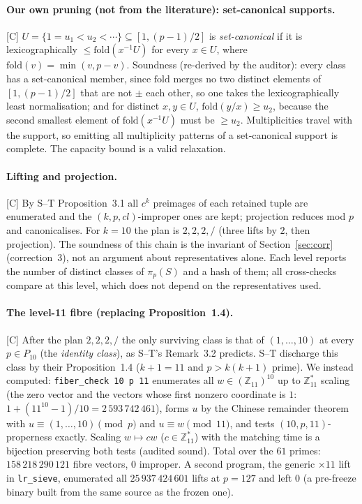 \documentclass[10pt]{article}
\newcommand{\tier}[1]{\textsf{[#1]}}
\newcommand{\tC}{\tier{C}}
\newcommand{\Z}{\mathbb{Z}}
\begin{document}
\paragraph{Our own pruning (not from the literature): set-canonical supports.}\tC{} $U=\{1=u_1<u_2<\cdots\}\subseteq[1,(p-1)/2]$ is \emph{set-canonical} if it is lexicographically $\le\mathrm{fold}(x^{-1}U)$ for every $x\in U$, where $\mathrm{fold}(v)=\min(v,p-v)$. Soundness (re-derived by the auditor): every class has a set-canonical member, since $\mathrm{fold}$ merges no two distinct elements of $[1,(p-1)/2]$ that are not $\pm$ each other, so one takes the lexicographically least normalisation; and for distinct $x,y\in U$, $\mathrm{fold}(y/x)\ge u_2$, because the second smallest element of $\mathrm{fold}(x^{-1}U)$ must be $\ge u_2$. Multiplicities travel with the support, so emitting all multiplicity patterns of a set-canonical support is complete. The capacity bound is a valid relaxation.

\paragraph{Lifting and projection.}\tC{} By S--T Proposition~3.1 all $c^k$ preimages of each retained tuple are enumerated and the $(k,p,cl)$-improper ones are kept; projection reduces mod $p$ and canonicalises. For $k=10$ the plan is $2,2,2,/$ (three lifts by $2$, then projection). The soundness of this chain is the invariant of Section~\ref{sec:corr} (correction~3), not an argument about representatives alone. Each level reports the number of distinct classes of $\pi_p(S)$ and a hash of them; all cross-checks compare at this level, which does not depend on the representatives used.

\paragraph{The level-11 fibre (replacing Proposition~1.4).}\tC{} After the plan $2,2,2,/$ the only surviving class is that of $(1,\dots,10)$ at every $p\in P_{10}$ (the \emph{identity class}), as S--T's Remark~3.2 predicts. S--T discharge this class by their Proposition~1.4 ($k+1=11$ and $p>k(k+1)$ prime). We instead computed: \texttt{fiber\_check 10 p 11} enumerates all $w\in(\Z_{11})^{10}$ up to $\Z_{11}^*$ scaling (the zero vector and the vectors whose first nonzero coordinate is $1$: $1+(11^{10}-1)/10=2\,593\,742\,461$), forms $u$ by the Chinese remainder theorem with $u\equiv(1,\dots,10)\pmod p$ and $u\equiv w\pmod{11}$, and tests $(10,p,11)$-properness exactly. Scaling $w\mapsto cw$ ($c\in\Z_{11}^*$) with the matching time is a bijection preserving both tests (audited sound). Total over the $61$ primes: $158\,218\,290\,121$ fibre vectors, $0$ improper.
A second program, the generic $\times11$ lift in \texttt{lr\_sieve}, enumerated all $25\,937\,424\,601$ lifts at $p=127$ and left $0$ (a pre-freeze binary built from the same source as the frozen one).
\end{document}
